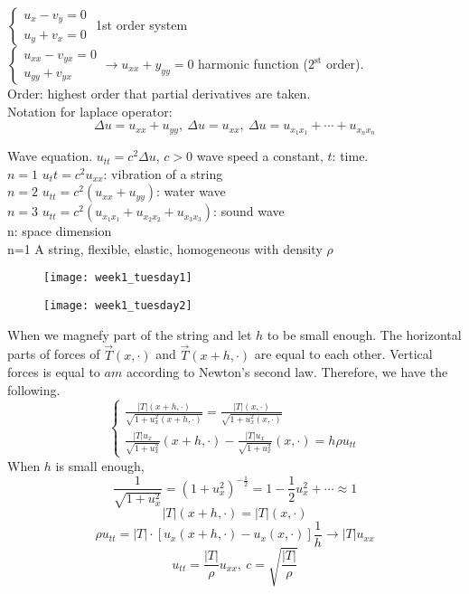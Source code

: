$\begin{cases}
u_x - v_y = 0 \\
u_y + v_x = 0
\end{cases}$ 1st order system\\
$\begin{cases}u_{xx}-v_{yx}=0\\u_{yy}+v_{yx}\end{cases}\rightarrow u_{xx}+y_{yy}=0$ harmonic function ($2^{\text{st}}$ order).\\
Order: highest order that partial derivatives are taken.\\
Notation for laplace operator:
\[\Delta u=u_{xx}+u_{yy},~ \Delta u=u_{xx},~ \Delta u=u_{x_1x_1}+\cdots +u_{x_nx_n}\]
\begin{example}
Wave equation. $u_{tt}=c^2\Delta u$, $c>0$ wave speed a constant, $t$: time.\\
$n=1$ $u_tt=c^2u_{xx}$: vibration of a string\\
$n=2$ $u_{tt}=c^2(u_{xx}+u_{yy})$: water wave\\
$n=3$ $u_{tt}=c^2(u_{x_1x_1}+u_{x_2x_2}+u_{x_3x_3})$: sound wave\\
n: space dimension\\
n=1 A string, flexible, elastic, homogeneous with density $\rho$
\begin{figure}[H]
\centering
\texttt{[image: week1\_tuesday1]}
\end{figure}
\begin{figure}[H]
\centering
\texttt{[image: week1\_tuesday2]}
\end{figure}
When we magnefy part of the string and let $h$ to be small enough. The horizontal parts of  forces of $\vec{T}(x,\cdot)$ and $\vec{T}(x+h,\cdot)$ are equal to each other. Vertical forces is equal to $am$ according to Newton's second law. Therefore, we have the following.
\[\left\{\begin{gathered}\frac{|T|(x+h,\cdot)}{\sqrt{1+u_x^2(x+h,\cdot)}}=\frac{|T|(x,\cdot)}{\sqrt{1+u_x^2(x,\cdot)}}\\\frac{|T|u_x}{\sqrt{1+u_x^2}}(x+h,\cdot)-\frac{|T|u_x}{\sqrt{1+u_x^2}}(x,\cdot)=h\rho u_{tt}\end{gathered}\right.
\]
When $h$ is small enough,
\[\frac{1}{\sqrt{1+u_x^2}}=(1+u_x^2)^{-\frac{1}{2}}=1-\frac{1}{2}u_x^2+\cdots\approx1
\]
\[|T|(x+h,\cdot)=|T|(x,\cdot)
\]
\[\rho u_{tt}=|T|\cdot[u_x(x+h,\cdot)-u_x(x,\cdot)]\frac{1}{h}\rightarrow |T|u_{xx}
\]
\[u_{tt}=\frac{|T|}{\rho}u_{xx},~ c=\sqrt{\frac{|T|}{\rho}}
\]

\end{example}
